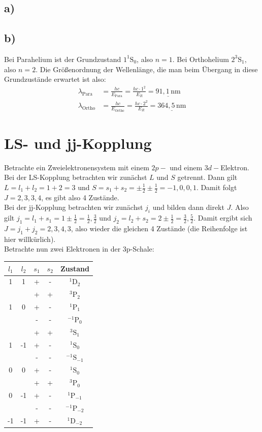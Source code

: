 \documentclass[a4paper,12pt]{article}
\newcommand{\tecxt}{}
\begin{document}
\subsection*{a)}
\subsection*{b)}
Bei Parahelium ist der Grundzustand $1^1\tecxt\text{S}_0$, also $n=1$. Bei Orthohelium $2^3\tecxt\text{S}_1$, also $n=2$. Die Größenordnung der Wellenlänge, die man beim Übergang in diese Grundzustände erwartet ist also:
\begin{align*}
\lambda_\tecxt\text{Para}&=\frac{hc}{E_\tecxt\text{Para}}=\frac{hc\cdot 1^2}{E_R}=\underline{91,1\,\tecxt\text{nm}}\\
\lambda_\tecxt\text{Ortho}&=\frac{hc}{E_\tecxt\text{Ortho}}=\frac{hc\cdot 2^2}{E_R}=\underline{364,5\,\tecxt\text{nm}}
\end{align*}
\section{LS- und jj-Kopplung}
Betrachte ein Zweielektronensystem mit einem $2p-$ und einem $3d-$Elektron. \\
Bei der LS-Kopplung betrachten wir zunächst $L$ und $S$ getrennt. Dann gilt $L=l_1+l_2=1+2=3$ und $S=s_1+s_2=\pm\frac{1}{2}\pm\frac{1}{2}=-1, 0, 0, 1$. Damit folgt $J=2, 3, 3, 4$, es gibt also 4 Zustände.\\
Bei der jj-Kopplung betrachten wir zunächst $j_i$ und bilden dann direkt $J$. Also gilt $j_1=l_1+s_1=1\pm\frac{1}{2}=\frac{1}{2},\frac{3}{2}$ und $j_2=l_2+s_2=2\pm\frac{1}{2}=\frac{3}{2},\frac{5}{2}$. Damit ergibt sich $J=j_1+j_2=2,3,4,3$, also wieder die gleichen 4 Zustände (die Reihenfolge ist hier willkürlich).\\
Betrachte nun zwei Elektronen in der 3p-Schale:
\begin{table}[h!]
\centering
\begin{tabular}{c|c|c|c|c}
$l_1$&$l_2$&$s_1$&$s_2$&Zustand \\ \hline
1&1&+&-&${}^{1}\tecxt\text{D}_{2}$ \\ \hline
 &&+&+&${}^{3}\tecxt\text{P}_{2}$ \\ 
1&0 &+&-&${}^{1}\tecxt\text{P}_{1}$ \\ 
 & &-&-&${}^{-1}\tecxt\text{P}_{0}$ \\ \hline
 & &+&+&${}^{3}\tecxt\text{S}_{1}$ \\ 
1&-1&+&-&${}^{1}\tecxt\text{S}_{0}$ \\ 
 & &-&-&${}^{-1}\tecxt\text{S}_{-1}$ \\ \hline
0&0&+&-&${}^{1}\tecxt\text{S}_{0}$ \\ \hline
 & &+&+&${}^{3}\tecxt\text{P}_{0}$ \\ 
0&-1&+&-&${}^{1}\tecxt\text{P}_{-1}$ \\ 
 & &-&-&${}^{-1}\tecxt\text{P}_{-2}$ \\ \hline
-1&-1&+&-&${}^{1}\tecxt\text{D}_{-2}$
\end{tabular}
\end{table}
\end{document}
